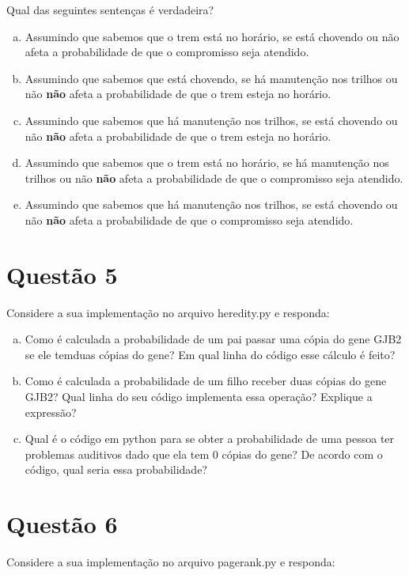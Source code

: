 \documentclass[a4paper,12pt]{article}
\begin{document}
Qual das seguintes sentenças é verdadeira?

\begin{enumerate}[a)]
    \item Assumindo que sabemos que o trem está no horário, se está chovendo ou não afeta a probabilidade de que o compromisso seja atendido.
    \item Assumindo que sabemos que está chovendo, se há manutenção nos trilhos ou não \textbf{não} afeta a probabilidade de que o trem esteja no horário.
    \item Assumindo que sabemos que há manutenção nos trilhos, se está chovendo ou não \textbf{não} afeta a probabilidade de que o trem esteja no horário.
    \item Assumindo que sabemos que o trem está no horário, se há manutenção nos trilhos ou não \textbf{não} afeta a probabilidade de que o compromisso seja atendido.
    \item Assumindo que sabemos que há manutenção nos trilhos, se está chovendo ou não \textbf{não} afeta a probabilidade de que o compromisso seja atendido.
\end{enumerate}

\section*{Questão 5}

Considere a sua implementação no arquivo heredity.py e responda:

\begin{enumerate} [a)]
    \item Como é calculada a probabilidade de um pai passar uma cópia do gene GJB2 se ele temduas cópias do gene? Em qual linha do código esse cálculo é feito?
    \item Como é calculada a probabilidade de um filho receber duas cópias do gene GJB2? Qual linha do seu código implementa essa operação? Explique a expressão?
    \item Qual é o código em python para se obter a probabilidade de uma pessoa ter problemas auditivos dado que ela tem 0 cópias do gene? De acordo com o código, qual seria essa probabilidade?
\end{enumerate}

\section*{Questão 6}

Considere a sua implementação no arquivo pagerank.py e responda:
\end{document}

